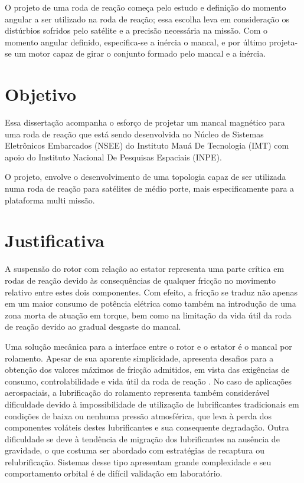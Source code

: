 O projeto de uma roda de reação começa pelo estudo e definição do momento angular a ser utilizado na roda de reação; essa escolha leva em consideração os distúrbios sofridos pelo satélite e a precisão necessária na missão. Com o momento angular definido, especifica-se a inércia o mancal, e por último projeta-se um motor capaz de girar o conjunto formado pelo mancal e a inércia.

\section{Objetivo}

Essa dissertação acompanha o esforço de projetar um mancal magnético para uma roda de reação que está sendo desenvolvida no Núcleo de Sistemas Eletrônicos Embarcados (NSEE) do Instituto Mauá De Tecnologia (IMT) com apoio do Instituto Nacional De Pesquisas Espaciais (INPE).

O projeto, envolve o desenvolvimento de uma topologia capaz de ser utilizada numa roda de reação para satélites de médio porte, mais especificamente para a plataforma multi missão.


\section{Justificativa}

A suspensão do rotor com relação ao estator representa uma parte crítica em rodas de reação \citep{taniwaki2003experimental} devido às consequências de qualquer fricção no movimento relativo entre estes dois componentes. Com efeito, a fricção se traduz não apenas em um maior consumo de potência elétrica como também na introdução de uma zona morta de atuação em torque, bem como na limitação da vida útil da roda de reação devido ao gradual desgaste do mancal.

Uma solução mecânica para a interface entre o rotor e o estator é o mancal por rolamento. Apesar de sua aparente simplicidade, apresenta desafios para a obtenção dos valores máximos de fricção admitidos, em vista das exigências de consumo, controlabilidade e vida útil da roda de reação \citep{Krishnan2010}. No caso de aplicações aerospaciais, a lubrificação do rolamento representa também considerável dificuldade devido à impossibilidade de utilização de lubrificantes tradicionais em condições de baixa ou nenhuma pressão atmosférica, que leva à perda dos componentes voláteis destes lubrificantes e sua consequente degradação. Outra dificuldade se deve à tendência de migração dos lubrificantes na ausência de gravidade, o que costuma ser abordado com estratégias de recaptura ou relubrificação. Sistemas desse tipo apresentam grande complexidade e seu comportamento orbital é de difícil validação em laboratório.

